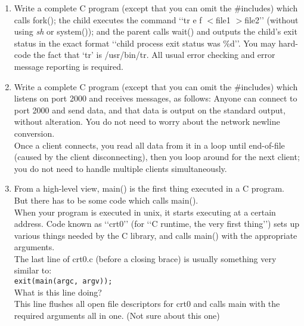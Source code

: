 \documentclass[11pt]{article}
\begin{document}
\begin{enumerate}
	\newpage
	\item Write a complete C program (except that you can omit the \#includes) which calls fork(); the child executes the command ‘‘tr e f $ <$file1 $ >$file2’’ (without using \textit{sh} or system()); and the parent calls wait() and outputs the child’s exit status in the exact format ‘‘child process exit status was \%d’’. You may hard-code the fact that ‘tr’ is /usr/bin/tr. All usual error checking and error message reporting is required.
		
		
	\newpage
	\item Write a complete C program (except that you can omit the \#includes) which listens on port 2000 and receives messages, as follows: Anyone can connect to port 2000 and send data, and that data is output on the standard output, without alteration. You do not need to worry about the network newline conversion.\\
	
	Once a client connects, you read all data from it in a loop until end-of-file (caused by the client disconnecting), then you loop around for the next client; you do not need to handle multiple clients simultaneously.
		
		
	\newpage
	\item From a high-level view, main() is the first thing executed in a C program. But there has to be some code which calls main().\\
	When your program is executed in unix, it starts executing at a certain address. Code known as ‘‘crt0’’ (for ‘‘C runtime, the very first thing’’) sets up various things needed by the C library, and calls main() with the appropriate arguments.\\
	The last line of crt0.c (before a closing brace) is usually something very similar to:\\
		\hspace*{1cm} \verb|exit(main(argc, argv));|\\
	What is this line doing?\\
	
		This line flushes all open file descriptors for crt0 and calls main with the required arguments all in one. (Not sure about this one)
\end{enumerate}
\end{document}
